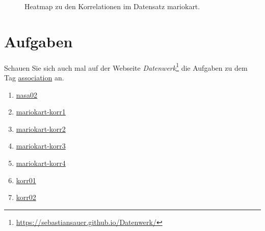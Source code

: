 \documentclass[
  letterpaper,
  twoside,
  open=any]{scrbook}
\providecommand{\tightlist}{%
  \setlength{\itemsep}{0pt}\setlength{\parskip}{0pt}}\usepackage{longtable,booktabs,array}
\theoremstyle{definition}
\theoremstyle{definition}
\theoremstyle{definition}
\theoremstyle{remark}
\begin{document}
\begin{figure}[H]


\caption{\label{fig-mario-corr-pdf}Heatmap zu den Korrelationen im
Datensatz mariokart.}

\end{figure}%

\section{Aufgaben}\label{aufgaben-6}

Schauen Sie sich auch mal auf der Webseite \emph{Datenwerk}\footnote{\url{https://sebastiansauer.github.io/Datenwerk/}}
die Aufgaben zu dem Tag
\href{https://sebastiansauer.github.io/Datenwerk/\#category=association}{association}
an.

\begin{enumerate}
\def\labelenumi{\arabic{enumi}.}
\tightlist
\item
  \href{https://sebastiansauer.github.io/Datenwerk/posts/nasa02/nasa02.html}{nasa02}
\item
  \href{https://sebastiansauer.github.io/Datenwerk/posts/mariokart-korr1/mariokart-korr1.html}{mariokart-korr1}
\item
  \href{https://sebastiansauer.github.io/Datenwerk/posts/mariokart-korr2/mariokart-korr2.html}{mariokart-korr2}
\item
  \href{https://sebastiansauer.github.io/Datenwerk/posts/mariokart-korr3/mariokart-korr3.html}{mariokart-korr3}
\item
  \href{https://sebastiansauer.github.io/Datenwerk/posts/mariokart-korr4/mariokart-korr4.html}{mariokart-korr4}
\item
  \href{https://sebastiansauer.github.io/Datenwerk/posts/korr01/korr01.html}{korr01}
\item
  \href{https://sebastiansauer.github.io/Datenwerk/posts/korr02/korr02.html}{korr02}
\end{enumerate}
\end{document}
